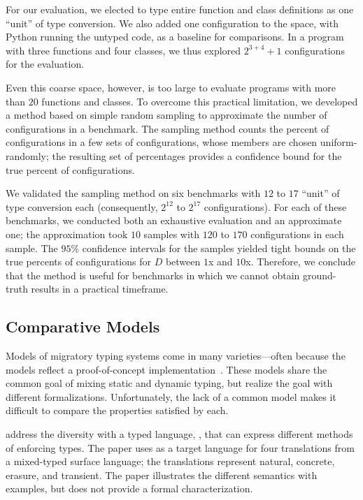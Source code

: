 For our evaluation, we elected to type entire function and class definitions
 as one ``unit'' of type conversion.
We also added one configuration to the space, with Python running the untyped
 code, as a baseline for comparisons.
In a program with three functions and four classes, we thus explored
 $2^{3+4} + 1$ configurations for the evaluation.

Even this coarse space, however, is too large to evaluate programs with more
 than $20$ functions and classes.
To overcome this practical limitation, we developed a method based on
 simple random sampling to approximate the number of 
 configurations in a benchmark.
The sampling method counts the percent of  configurations
 in a few sets of configurations, whose members are chosen uniform-randomly;
 the resulting set of percentages provides a confidence bound for the true
 percent of  configurations.

We validated the sampling method on six benchmarks with $12$ to $17$ ``unit''
 of type conversion each (consequently, $2^{12}$ to $2^{17}$ configurations).
For each of these benchmarks, we conducted both an exhaustive evaluation and
 an approximate one; the approximation took $10$ samples with $120$ to $170$
 configurations in each sample.
The $95$\% confidence intervals for the samples yielded tight bounds on the
 true percents of  configurations for $D$ between $1$x and
 $10$x.
Therefore, we conclude that the method is useful for benchmarks in which we
 cannot obtain ground-truth results in a practical timeframe.


\subsection{Comparative Models}

Models of migratory typing systems come in many varieties---often because
 the models reflect a proof-of-concept implementation~\cite{bat-ecoop-2014,wnlov-popl-2010,mt-oopsla-2017,vss-popl-2017,tf-popl-2008}.
These models share the common goal of mixing static and dynamic typing,
 but realize the goal with different formalizations.
Unfortunately, the lack of a common model makes it difficult to compare the
 properties satisfied by each.

\citet{clzv-ecoop-2018} address the diversity with a typed language, \kafka{},
 that can express different methods of enforcing types.
The paper uses \kafka{} as a target language for four translations from
 a mixed-typed surface language; the translations represent natural,
 concrete, erasure, and transient.
The paper illustrates the different semantics with examples, but does not
 provide a formal characterization.

